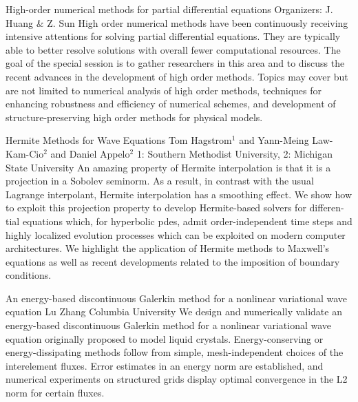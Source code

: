 \label{mini10}

\miniabs
{High-order numerical methods for partial differential equations}
{Organizers: J. Huang \& Z. Sun}
{High order numerical methods have been continuously receiving intensive attentions for solving partial differential equations. They are typically able to better resolve solutions with overall fewer computational resources. The goal of the special session is to gather researchers in this area and to discuss the recent advances in the development of high order methods. Topics may cover but are not limited to numerical analysis of high order methods, techniques for enhancing robustness and efficiency of numerical schemes, and development of structure-preserving high order methods for physical models.}

\begin{addmargin}[2em]{0em}
\vspace{2ex}
\abs
{Hermite Methods for Wave Equations}
{Tom Hagstrom$^{1}$ and Yann-Meing Law-Kam-Cio$^{2}$ and Daniel Appelo$^{2}$}
{1: Southern Methodist University, 2: Michigan State University}
{An amazing property of Hermite interpolation is that it is a projection in a Sobolev seminorm. As a result, in contrast with the usual Lagrange interpolant, Hermite interpolation has a smoothing effect. We show how to exploit this projection property to develop Hermite-based solvers for differen- tial equations which, for hyperbolic pdes, admit order-independent time steps and highly localized evolution processes which can be exploited on modern computer architectures. We highlight the application of Hermite methods to Maxwell’s equations as well as recent developments related to the imposition of boundary conditions.}


\vspace{1.5ex}
\abs
{An energy-based discontinuous Galerkin method for a nonlinear variational wave equation}
{Lu Zhang}
{Columbia University}
{We design and numerically validate an energy-based discontinuous Galerkin method for a nonlinear variational wave equation originally proposed to model liquid crystals. Energy-conserving or energy-dissipating methods follow from simple, mesh-independent choices of the interelement fluxes. Error estimates in an energy norm are established, and numerical experiments on structured grids display optimal convergence in the L2 norm for certain fluxes.}



\end{addmargin}
